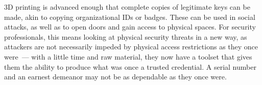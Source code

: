 \documentclass{acm_proc_article-sp}
\begin{document}
3D printing is advanced enough that complete copies of legitimate keys can be made, akin to copying organizational IDs or badges. These can be used in social attacks, as well as to open doors and gain access to physical spaces. For security professionals, this means looking at physical security threats in a new way, as attackers are not necessarily impeded by physical access restrictions as they once were~--- with a little time and raw material, they now have a toolset that gives them the ability to produce what was once a trusted credential. A serial number and an earnest demeanor may not be as dependable as they once were.

% 


\nocite{*}
\balancecolumns
\end{document}
